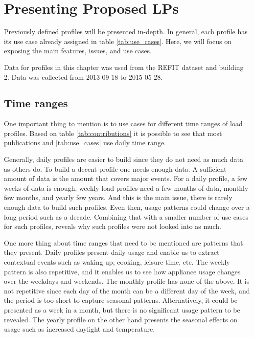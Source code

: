\label{chapter4}
\chapter{Presenting Proposed LPs}

Previously defined profiles will be presented in-depth. 
In general, each profile has its use case already assigned in table \ref{tab:use_cases}.
Here, we will focus on exposing the main features, issues, and use cases. 

Data for profiles in this chapter was used from the REFIT dataset and building 2.
Data was collected from 2013-09-18 to 2015-05-28.

\section{Time ranges}
One important thing to mention is to use cases for different time ranges of load profiles.
Based on table \ref{tab:contributions} it is possible to see that most publications and \ref{tab:use_cases} use daily time range.

Generally, daily profiles are easier to build since they do not need as much data as others do.
To build a decent profile one needs enough data. 
A sufficient amount of data is the amount that covers major events.
For a daily profile, a few weeks of data is enough, weekly load profiles need a few months of data, monthly few months, and yearly few years.
And this is the main issue, there is rarely enough data to build such profiles.
Even then, usage patterns could change over a long period such as a decade.
Combining that with a smaller number of use cases for such profiles, reveals why such profiles were not looked into as much.

One more thing about time ranges that need to be mentioned are patterns that they present.
Daily profiles present daily usage and enable us to extract contextual events such as waking up, cooking, leisure time, etc.
The weekly pattern is also repetitive, and it enables us to see how appliance usage changes over the weekdays and weekends.
The monthly profile has none of the above. It is not repetitive since each day of the month can be a different day of the week, and the period is too short to capture seasonal patterns.
Alternatively, it could be presented as a week in a month, but there is no significant usage pattern to be revealed.
The yearly profile on the other hand presents the seasonal effects on usage such as increased daylight and temperature. 


